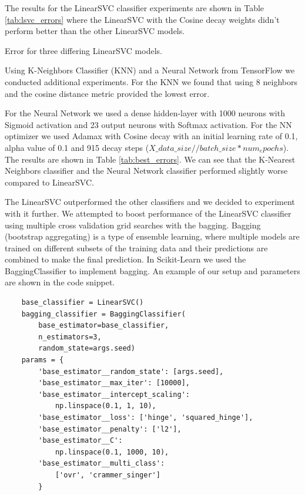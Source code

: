 The results for the LinearSVC classifier experiments are shown in Table \ref{tab:lsvc_errors} where the LinearSVC with the Cosine decay weights didn't perform better than the other LinearSVC models.

\begin{table}[!ht]
\centering
\caption{Error for three differing LinearSVC models.}

\label{tab:lsvc_errors}
\end{table}

Using K-Neighbors Classifier (KNN) and a Neural Network from TensorFlow we conducted additional experiments. For the KNN we found that using 8 neighbors and the cosine distance metric provided the lowest error. 

For the Neural Network we used a dense hidden-layer with 1000 neurons with Sigmoid activation and 23 output neurons with Softmax activation. For the NN optimizer we used Adamax with Cosine decay with an initial learning rate of 0.1, alpha value of 0.1 and 915 decay steps ($X\_data\_size // batch\_size * num_epochs$). The results are shown in Table \ref{tab:best_errors}. We can see that the K-Nearest Neighbors classifier and the Neural Network classifier performed slightly worse compared to LinearSVC.

The LinearSVC outperformed the other classifiers and we decided to experiment with it further. We attempted to boost performance of the LinearSVC classifier using multiple cross validation grid searches with the bagging. Bagging (bootstrap aggregating) is a type of ensemble learning, where multiple models are trained on different subsets of the training data and their predictions are combined to make the final prediction. In Scikit-Learn we used the BaggingClassifier to implement bagging. An example of our setup and parameters are shown in the code snippet. 

\begin{verbatim}
    base_classifier = LinearSVC()
    bagging_classifier = BaggingClassifier(
        base_estimator=base_classifier, 
        n_estimators=3, 
        random_state=args.seed)
    params = {
        'base_estimator__random_state': [args.seed],
        'base_estimator__max_iter': [10000],
        'base_estimator__intercept_scaling': 
            np.linspace(0.1, 1, 10),
        'base_estimator__loss': ['hinge', 'squared_hinge'],
        'base_estimator__penalty': ['l2'],
        'base_estimator__C': 
            np.linspace(0.1, 1000, 10),
        'base_estimator__multi_class': 
            ['ovr', 'crammer_singer']
        }
\end{verbatim}

